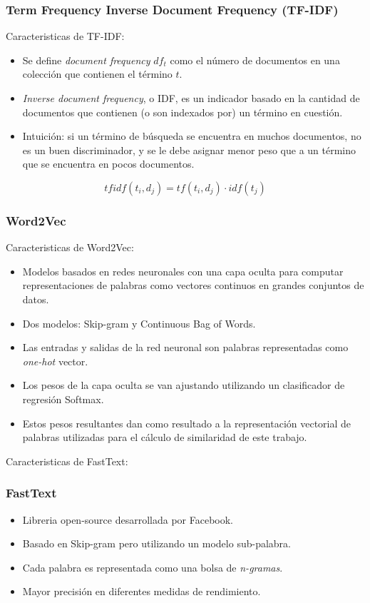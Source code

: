 \begin{frame}
	\frametitle{Term Frequency Inverse Document Frequency (TF-IDF)}
	Caracteristicas de TF-IDF:
	\bigskip
	\begin{itemize}[<*>]
		\item Se define \textit{document frequency} \(df_t\) como el número de documentos en una colección que contienen el término \(t\).
		\item \textit{Inverse document frequency}, o IDF, es un indicador basado en la cantidad de documentos que contienen (o son indexados por) un término en cuestión.
		\item Intuición: si un término de búsqueda se encuentra en muchos documentos, no es un buen discriminador, y se le debe asignar menor peso que a un término que se encuentra en pocos documentos.
	\end{itemize}

	\centering
	\[tfidf(t_i, d_j) = tf(t_i, d_j) \cdot idf(t_j)\]
\end{frame}

\begin{frame}
	\frametitle{Word2Vec}
	Caracteristicas de Word2Vec:
	\bigskip
	\begin{itemize}[<*>]
		\item Modelos basados en redes neuronales con una capa oculta para computar representaciones de palabras como vectores continuos en grandes conjuntos de datos.
		\item Dos modelos: Skip-gram y Continuous Bag of Words.
		\item Las entradas y salidas de la red neuronal son palabras representadas como \textit{one-hot} vector.
		\item Los pesos de la capa oculta se van ajustando utilizando un clasificador de regresión Softmax.
		\item Estos pesos resultantes dan como resultado a la representación vectorial de palabras utilizadas para el cálculo de similaridad de este trabajo.
	\end{itemize}
\end{frame}

\begin{frame}
	Caracteristicas de FastText:
	\bigskip
	\frametitle{FastText}
	\begin{itemize}[<*>]
		\item Libreria open-source desarrollada por Facebook.
		\item Basado en Skip-gram pero utilizando un modelo sub-palabra.
		\item Cada palabra es representada como una bolsa de \textit{n-gramas}.
		\item Mayor precisión en diferentes medidas de rendimiento.
	\end{itemize}
\end{frame}

